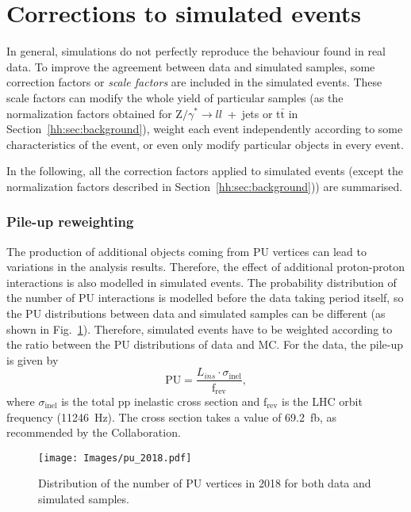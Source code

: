 \documentclass[../main.tex]{subfiles}
\begin{document}
\section{Corrections to simulated events}
\label{hh:sec:corrections}

In general, simulations do not perfectly reproduce the behaviour found in real data. To improve the agreement between data and simulated samples, some correction factors or \textit{scale factors}  are included in the simulated events. These scale factors can modify the whole yield of particular samples (as the normalization factors obtained for Z$/\gamma^*\to ll$~+~jets or t$\bar{\text{t}}$ in Section~\ref{hh:sec:background}), weight each event independently according to some characteristics of the event, or even only modify particular objects in every event.

In the following, all the correction factors applied to simulated events (except the normalization factors described in Section~\ref{hh:sec:background})) are summarised.

\subsubsection*{Pile-up reweighting}
\label{hh:sec:pu}

The production of additional objects coming from PU vertices can lead to variations in the analysis results. Therefore, the effect of additional proton-proton interactions is also modelled in simulated events. The probability distribution of the number of PU interactions is modelled before the data taking period itself, so the PU distributions between data and simulated samples can be different (as shown in Fig.~\ref{hh:fig:pu}). Therefore, simulated events have to be weighted according to the ratio between the PU distributions of data and MC. For the data, the pile-up is given by
\begin{equation}
\text{PU} = \frac{L_{ins}\cdot\sigma_{\text{inel}}}{\text{f}_\text{rev}},
\end{equation}
where $\sigma_{\text{inel}}$ is the total pp inelastic cross section and $\text{f}_\text{rev}$ is the LHC orbit frequency (11246~Hz). The cross section takes a value of 69.2~fb, as recommended by the Collaboration.

\begin{figure}[h!]
\begin{center}
\texttt{[image: Images/pu\_2018.pdf]}
\end{center}
\caption[Data and simulation PU distributions]{Distribution of the number of PU vertices in 2018 for both data and simulated samples.}
\label{hh:fig:pu}
\end{figure}
\end{document}
